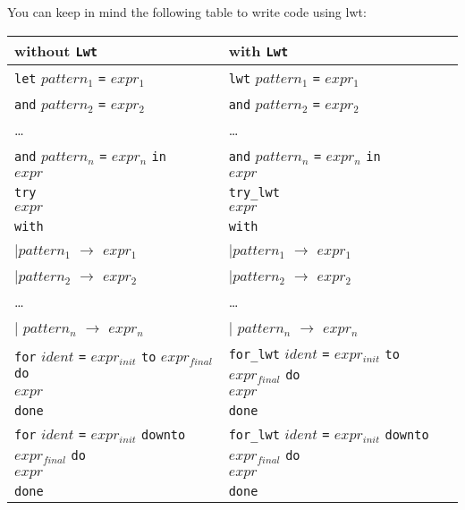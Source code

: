 \documentclass{article}
\newcommand{\lwt}{\texttt{Lwt}\xspace}
\begin{document}
You can keep in mind the following table to write code using lwt:

\begin{center}
  \begin{tabular}{|l|l|}
    \hline

    \textbf{without \lwt} & \textbf{with \lwt} \\

    \hline

    \texttt{let} $pattern_1$ \texttt{=} $expr_1$ &
    \texttt{lwt} $pattern_1$ \texttt{=} $expr_1$ \\
    \texttt{and} $pattern_2$ \texttt{=} $expr_2$ &
    \texttt{and} $pattern_2$ \texttt{=} $expr_2$ \\
    \dots &
    \dots \\
    \texttt{and} $pattern_n$ \texttt{=} $expr_n$ \texttt{in} &
    \texttt{and} $pattern_n$ \texttt{=} $expr_n$ \texttt{in} \\
    $expr$ &
    $expr$ \\

    \hline

    \texttt{try} &
    \texttt{try\_lwt} \\
    \:\: $expr$ &
    \:\: $expr$ \\
    \texttt{with} &
    \texttt{with} \\
    \:\: $\mid pattern_1$ \texttt{$\rightarrow$} $expr_1$ &
    \:\: $\mid pattern_1$ \texttt{$\rightarrow$} $expr_1$ \\
    \:\: $\mid pattern_2$ \texttt{$\rightarrow$} $expr_2$ &
    \:\: $\mid pattern_2$ \texttt{$\rightarrow$} $expr_2$ \\
    \:\: \dots &
    \:\: \dots \\
    \:\: $\mid$ $pattern_n$ \texttt{$\rightarrow$} $expr_n$ &
    \:\: $\mid$ $pattern_n$ \texttt{$\rightarrow$} $expr_n$ \\

    \hline

    \texttt{for} $ident$ \texttt{=} $expr_{init}$ \texttt{to} $expr_{final}$ \texttt{do} &
    \texttt{for\_lwt} $ident$ \texttt{=} $expr_{init}$ \texttt{to} $expr_{final}$ \texttt{do} \\
    \:\: $expr$ &
    \:\: $expr$ \\
    \texttt{done} &
    \texttt{done} \\

    \hline

    \texttt{for} $ident$ \texttt{=} $expr_{init}$ \texttt{downto} $expr_{final}$ \texttt{do} &
    \texttt{for\_lwt} $ident$ \texttt{=} $expr_{init}$ \texttt{downto} $expr_{final}$ \texttt{do} \\
    \:\: $expr$ &
    \:\: $expr$ \\
    \texttt{done} &
    \texttt{done} \\

    \hline
  \end{tabular}
\end{center}
\end{document}
